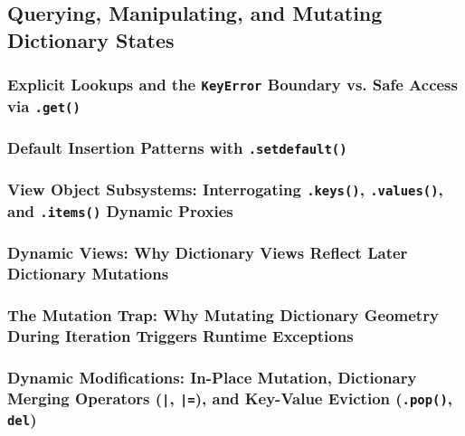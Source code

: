 \subsection{Querying, Manipulating, and Mutating Dictionary States}
\subsubsection{Explicit Lookups and the \texttt{KeyError} Boundary vs. Safe Access via \texttt{.get()}}
\subsubsection{Default Insertion Patterns with \texttt{.setdefault()}}
\subsubsection{View Object Subsystems: Interrogating \texttt{.keys()}, \texttt{.values()}, and \texttt{.items()} Dynamic Proxies}
\subsubsection{Dynamic Views: Why Dictionary Views Reflect Later Dictionary Mutations}
\subsubsection{The Mutation Trap: Why Mutating Dictionary Geometry During Iteration Triggers Runtime Exceptions}
\subsubsection{Dynamic Modifications: In-Place Mutation, Dictionary Merging Operators (\texttt{|}, \texttt{|=}), and Key-Value Eviction (\texttt{.pop()}, \texttt{del})}
